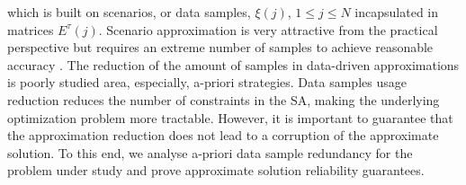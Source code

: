 which is built on scenarios, or data samples, $\xi(j)$, $1\le j \le N$ incapsulated in matrices $E^\tau(j)$. %
\vspace{-2mm}
Scenario approximation is very attractive from the practical perspective but requires an extreme number of samples to achieve reasonable accuracy \cite{calafiore2006scenario}. The reduction of the amount of samples in data-driven approximations is poorly studied area, especially, a-priori strategies. Data samples usage reduction reduces the number of constraints in the SA, making the underlying optimization problem more tractable. However, it is important to guarantee that the approximation reduction does not lead to a corruption of the approximate solution. To this end, we analyse a-priori data sample redundancy for the problem under study and prove approximate solution reliability guarantees.
